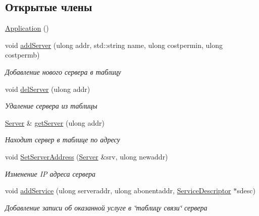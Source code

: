 \subsection*{Открытые члены}
\begin{DoxyCompactItemize}
\item 
\hyperlink{class_network_service_1_1_application_abfad2c23a7824c984a7ee1e6141d732b}{Application} ()
\item 
void \hyperlink{class_network_service_1_1_application_a7c718890bcaa6cce31f29c1ae7e69b81}{add\+Server} (ulong addr, std\+::string name, ulong costpermin, ulong costpermb)
\begin{DoxyCompactList}\small\item\em Добавление нового сервера в таблицу \end{DoxyCompactList}\item 
void \hyperlink{class_network_service_1_1_application_ad09e462bffd3345934a1e3f3eca89774}{del\+Server} (ulong addr)
\begin{DoxyCompactList}\small\item\em Удаление сервера из таблицы \end{DoxyCompactList}\item 
\hyperlink{class_network_service_1_1_server}{Server} \& \hyperlink{class_network_service_1_1_application_acb73429fd01baca7eb138c316f05c97a}{get\+Server} (ulong addr)
\begin{DoxyCompactList}\small\item\em Находит сервер в таблице по адресу \end{DoxyCompactList}\item 
void \hyperlink{class_network_service_1_1_application_a7b18fb99b391286a0cf85c3c731b5982}{Set\+Server\+Address} (\hyperlink{class_network_service_1_1_server}{Server} \&srv, ulong newaddr)
\begin{DoxyCompactList}\small\item\em Изменение I\+P адреса сервера \end{DoxyCompactList}\item 
void \hyperlink{class_network_service_1_1_application_a31f7383eb1d003932ca6d3111571ef2e}{add\+Service} (ulong serveraddr, ulong abonentaddr, \hyperlink{class_network_service_1_1_service_descriptor}{Service\+Descriptor} $\ast$sdesc)
\begin{DoxyCompactList}\small\item\em Добавление записи об оказанной услуге в \char`\"{}таблицу связи\char`\"{} сервера \end{DoxyCompactList}\item 

\end{DoxyCompactItemize}
